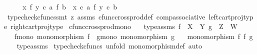 \begin{isabellebody}
\ \ \isamarkupfalse%
\ \isamarkupfalse%
\ {\isachardoublequoteopen}{\isacharparenleft}{\kern0pt}x\ {\isasymtimes}\isactrlsub f\ y{\isacharparenright}{\kern0pt}\ {\isasymcirc}\isactrlsub c\ a\ {\isasymtimes}\isactrlsub f\ b\ {\isacharequal}{\kern0pt}\ {\isacharparenleft}{\kern0pt}x\ {\isasymcirc}\isactrlsub c\ a{\isacharparenright}{\kern0pt}\ {\isasymtimes}\isactrlsub f\ y\ {\isasymcirc}\isactrlsub c\ b{\isachardoublequoteclose}\isanewline
\ \ \ \ \isamarkupfalse%
\ {\isacharparenleft}{\kern0pt}typecheck{\isacharunderscore}{\kern0pt}cfuncs{\isacharcomma}{\kern0pt}smt\ {\isacharparenleft}{\kern0pt}z{}{\isacharparenright}{\kern0pt}\ assms\ cfunc{\isacharunderscore}{\kern0pt}cross{\isacharunderscore}{\kern0pt}prod{\isacharunderscore}{\kern0pt}def{}\ comp{\isacharunderscore}{\kern0pt}associative{}\ left{\isacharunderscore}{\kern0pt}cart{\isacharunderscore}{\kern0pt}proj{\isacharunderscore}{\kern0pt}type\ right{\isacharunderscore}{\kern0pt}cart{\isacharunderscore}{\kern0pt}proj{\isacharunderscore}{\kern0pt}type{\isacharparenright}{\kern0pt}\isanewline
{}\isamarkupfalse%
%
\endisatagproof
{\isafoldproof}%
%
\isadelimproof
\isanewline
%
\endisadelimproof
\isanewline
{}\isamarkupfalse%
\ cfunc{\isacharunderscore}{\kern0pt}cross{\isacharunderscore}{\kern0pt}prod{\isacharunderscore}{\kern0pt}mono{\isacharcolon}{\kern0pt}\isanewline
\ \ \ type{\isacharunderscore}{\kern0pt}assms{\isacharcolon}{\kern0pt}\ {\isachardoublequoteopen}f\ {\isacharcolon}{\kern0pt}\ X\ {\isasymrightarrow}\ Y{\isachardoublequoteclose}\ {\isachardoublequoteopen}g\ {\isacharcolon}{\kern0pt}\ Z\ {\isasymrightarrow}\ W{\isachardoublequoteclose}\isanewline
\ \ \ f{\isacharunderscore}{\kern0pt}mono{\isacharcolon}{\kern0pt}\ {\isachardoublequoteopen}monomorphism\ f{\isachardoublequoteclose}\ \ g{\isacharunderscore}{\kern0pt}mono{\isacharcolon}{\kern0pt}\ {\isachardoublequoteopen}monomorphism\ g{\isachardoublequoteclose}\isanewline
\ \ \ {\isachardoublequoteopen}monomorphism\ {\isacharparenleft}{\kern0pt}f\ {\isasymtimes}\isactrlsub f\ g{\isacharparenright}{\kern0pt}{\isachardoublequoteclose}\isanewline
%
\isadelimproof
\ \ %
\endisadelimproof
%
\isatagproof
{}\isamarkupfalse%
\ type{\isacharunderscore}{\kern0pt}assms\isanewline
{}\isamarkupfalse%
\ {\isacharparenleft}{\kern0pt}typecheck{\isacharunderscore}{\kern0pt}cfuncs{\isacharcomma}{\kern0pt}\ unfold\ monomorphism{\isacharunderscore}{\kern0pt}def{}{\isacharcomma}{\kern0pt}\ auto{\isacharparenright}{\kern0pt}\isanewline

\end{isabellebody}
